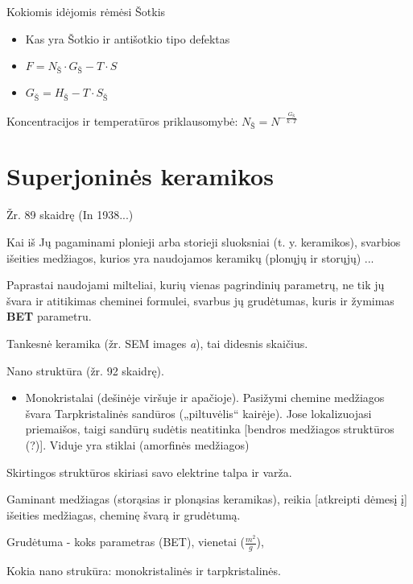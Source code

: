 \begin{remember}
  \item Kokiomis idėjomis rėmėsi Šotkis\begin{itemize}
    \item Kas yra Šotkio ir antišotkio tipo defektas
    \item $F = N_Š \cdot G_Š - T \cdot S$
    \item $G_Š = H_Š - T \cdot S_Š$
  \end{itemize}
  \item Koncentracijos ir temperatūros priklausomybė:
  $N_Š = N^{-\frac{G_Š}{k \cdot T}}$
\end{remember}


\section{Superjoninės keramikos}
Žr. 89 skaidrę (In 1938...)

Kai iš Jų pagaminami plonieji arba storieji sluoksniai (t. y. keramikos),
svarbios išeities medžiagos, kurios yra naudojamos keramikų (plonųjų ir
storųjų) ...

Paprastai naudojami milteliai, kurių vienas pagrindinių parametrų,
ne tik jų švara ir atitikimas cheminei formulei,
svarbus jų grudėtumas, kuris ir žymimas \textbf{BET} parametru.

Tankesnė keramika (žr. SEM images \textit{a}), tai didesnis skaičius.

Nano struktūra (žr. 92 skaidrę).\begin{itemize}
  \item Monokristalai (dešinėje viršuje ir apačioje). Pasižymi chemine
  medžiagos švara
  \itme Tarpkristalinės sandūros („piltuvėlis“ kairėje).
  Jose lokalizuojasi priemaišos, taigi sandūrų sudėtis neatitinka
  [bendros medžiagos struktūros (?)]. Viduje yra stiklai (amorfinės
  medžiagos)
\end{itemize}
Skirtingos struktūros skiriasi savo elektrine talpa ir varža.

\begin{remember}
  \item Gaminant medžiagas (storąsias ir plonąsias keramikas), reikia
  [atkreipti dėmesį į] išeities medžiagas, cheminę švarą ir grudėtumą.
  \item Grudėtuma - koks parametras (BET), vienetai ($\frac{m^2}{g}$),
  \item Kokia nano strukūra: monokristalinės ir tarpkristalinės.
\end{remember}


